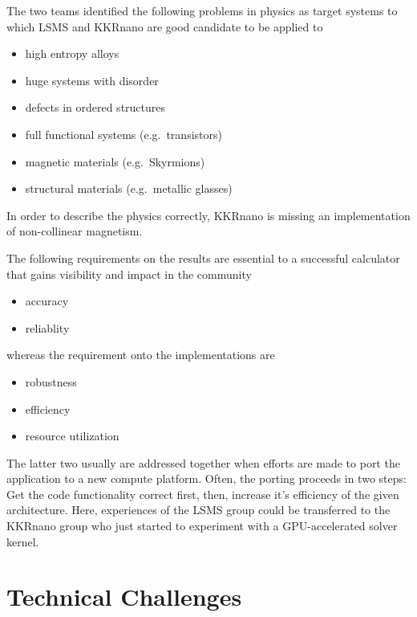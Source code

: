 \documentclass{llncs}
\def\KKRnano{{KKRnano}}
\def\LSMS{{LSMS}}
\begin{document}
The two teams identified the following problems in physics as target systems to which \LSMS{} and \KKRnano{}
are good candidate to be applied to
\begin{itemize}
 \item high entropy alloys
 \item huge systems with disorder
 \item defects in ordered structures
 \item full functional systems (e.g.~transistors)
 \item magnetic materials (e.g.~Skyrmions)
 \item structural materials (e.g.~metallic glasses)
\end{itemize}

In order to describe the physics correctly, \KKRnano{} is missing an implementation of non-collinear magnetism.


The following requirements on the results are essential to a successful calculator that gains visibility and impact in the community
\begin{itemize}
 \item accuracy
 \item reliablity
\end{itemize}
whereas the requirement onto the implementations are
\begin{itemize}
 \item robustness
 \item efficiency
 \item resource utilization 
\end{itemize}
The latter two usually are addressed together when efforts are made to port the application to a new compute platform.
Often, the porting proceeds in two steps: Get the code functionality correct first, then, increase it's efficiency of 
the given architecture. Here, experiences of the \LSMS{} group could be transferred to the \KKRnano{} group who just
started to experiment with a GPU-accelerated solver kernel.

\section{Technical Challenges} \label{section:tech}
\end{document}
